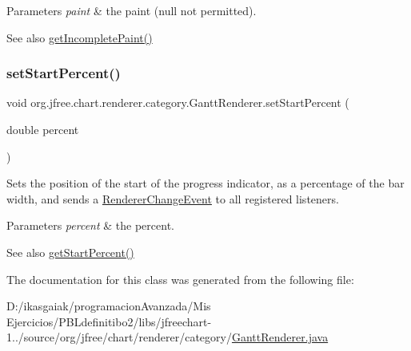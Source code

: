 \begin{DoxyParams}{Parameters}
{\em paint} & the paint ({\ttfamily null} not permitted).\\
\hline
\end{DoxyParams}
\begin{DoxySeeAlso}{See also}
\mbox{\hyperlink{classorg_1_1jfree_1_1chart_1_1renderer_1_1category_1_1_gantt_renderer_a2b26bad11e194ccbe68243b368d87240}{get\+Incomplete\+Paint()}} 
\end{DoxySeeAlso}
\mbox{\label{classorg_1_1jfree_1_1chart_1_1renderer_1_1category_1_1_gantt_renderer_a3541315737abffd6295be998a0c4d2b6}} 
\subsubsection{\texorpdfstring{set\+Start\+Percent()}{setStartPercent()}}
{\footnotesize\ttfamily void org.\+jfree.\+chart.\+renderer.\+category.\+Gantt\+Renderer.\+set\+Start\+Percent (\begin{DoxyParamCaption}\item[{double}]{percent }\end{DoxyParamCaption})}

Sets the position of the start of the progress indicator, as a percentage of the bar width, and sends a \mbox{\hyperlink{}{Renderer\+Change\+Event}} to all registered listeners.


\begin{DoxyParams}{Parameters}
{\em percent} & the percent.\\
\hline
\end{DoxyParams}
\begin{DoxySeeAlso}{See also}
\mbox{\hyperlink{classorg_1_1jfree_1_1chart_1_1renderer_1_1category_1_1_gantt_renderer_a3c72daf1588ba204a38f49a01cd387f3}{get\+Start\+Percent()}} 
\end{DoxySeeAlso}


The documentation for this class was generated from the following file\+:\begin{DoxyCompactItemize}
\item 
D\+:/ikasgaiak/programacion\+Avanzada/\+Mis Ejercicios/\+P\+B\+Ldefinitibo2/libs/jfreechart-\/1../source/org/jfree/chart/renderer/category/\mbox{\hyperlink{_gantt_renderer_8java}{Gantt\+Renderer.\+java}}\end{DoxyCompactItemize}
